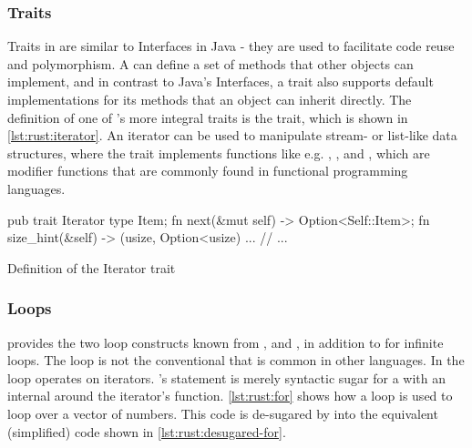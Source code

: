 \subsubsection{Traits}

Traits in {\rust} are similar to Interfaces in Java - they are used to facilitate code reuse and polymorphism.
A  can define a set of methods that other objects can implement, and in contrast to Java's Interfaces, a trait also supports default implementations for its methods that an object can inherit directly.
The definition of one of {\rust}'s more integral traits is the  trait, which is shown in \autoref{lst:rust:iterator}.
An iterator can be used to manipulate stream- or list-like data structures, where the trait implements functions like e.g. , , and , which are modifier functions that are commonly found in functional programming languages.

\begin{listing}[H]
  \begin{rustcode}
pub trait Iterator {
  type Item;
  fn next(&mut self) -> Option<Self::Item>;
  fn size_hint(&self) -> (usize, Option<usize) { ... }
  // ...
}
  \end{rustcode}
  \caption{Definition of the Iterator trait}
  \label{lst:rust:iterator}
\end{listing}

\subsubsection{Loops}
\label{sec:rust:loops}

{\rust} provides the two loop constructs known from {\C},  and , in addition to  for infinite loops.
The  loop is not the conventional  that is common in other languages.
In {\rust} the  loop operates on iterators.
\rust's  statement is merely syntactic sugar for a  with an internal  around the iterator's  function.
\autoref{lst:rust:for} shows how a  loop is used to loop over a vector of numbers.
This code is de-sugared by {\rust} into the equivalent (simplified) code shown in \autoref{lst:rust:desugared-for}.

